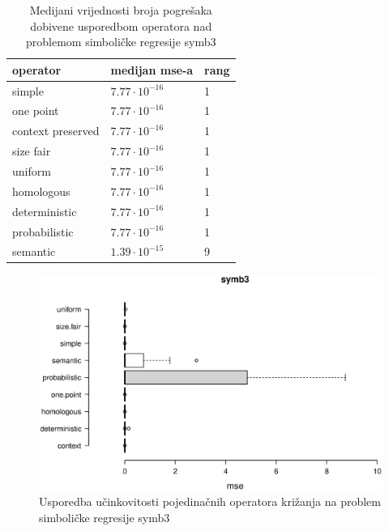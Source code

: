 \begin{table}[H]
 	\centering

    \caption{Medijani vrijednosti broja pogrešaka dobivene usporedbom operatora nad problemom simboličke regresije symb3}
    \begin{tabular}{| l | l | l |}
    \hline
    \textbf{operator} & \textbf{medijan mse-a} & \textbf{rang}\\ \hline
    simple & $7.77 \cdot 10^{-16}$ & 1\\ \hline
    one point & $7.77 \cdot 10^{-16}$ & 1\\ \hline
    context preserved &$7.77 \cdot 10^{-16}$& 1 \\ \hline
    size fair & $7.77 \cdot 10^{-16}$ & 1\\ \hline
    uniform & $7.77 \cdot 10^{-16}$ & 1\\ \hline
    homologous & $7.77 \cdot 10^{-16}$ & 1\\ \hline
    deterministic & $7.77 \cdot 10^{-16}$ & 1\\ \hline
    probabilistic & $7.77 \cdot 10^{-16}$ & 1\\ \hline
    semantic & $1.39 \cdot 10^{-15}$ & 9\\ \hline
    \end{tabular}
    
    \label{symb3table}
\end{table}

\begin{figure}[H]
	\centering
	\includegraphics[trim=0cm 4cm 0cm 0cm, scale=0.6]{./slike/boxPlots/symb3.eps}
	\caption{Usporedba učinkovitosti pojedinačnih operatora križanja na problem simboličke regresije symb3}
	\label{symb3box}
\end{figure}

